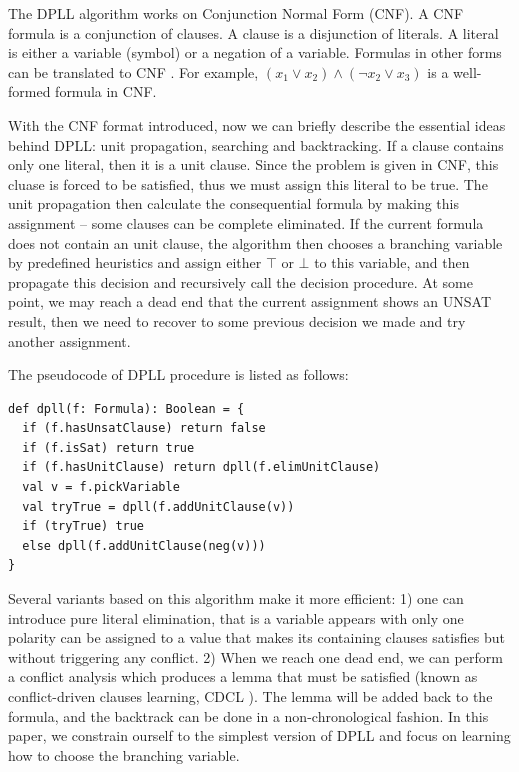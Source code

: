 \documentclass[sigplan,10pt]{acmart}\settopmatter{printfolios=true,printccs=false,printacmref=false}
\begin{document}
The DPLL algorithm works on Conjunction Normal Form (CNF). 
A CNF formula is a conjunction of clauses. A clause is a disjunction of literals. 
A literal is either a variable (symbol) or a negation of a variable. 
Formulas in other forms can be translated to CNF \cite{tseitin1983complexity}. 
For example, $(x_1 \vee x_2) \wedge (\neg x_2 \vee x_3)$ is a well-formed formula in CNF.

With the CNF format introduced, now we can briefly describe the essential ideas behind DPLL: 
unit propagation, searching and backtracking.
If a clause contains only one literal, then it is a unit clause. Since the problem is given 
in CNF, this cluase is forced to be satisfied, thus we must assign this literal to be true. 
The unit propagation then calculate the consequential formula by making this assignment --
some clauses can be complete eliminated.
If the current formula does not contain an unit clause, the algorithm then chooses a branching
variable by predefined heuristics and assign either $\top$ or $\bot$ to this variable,
and then propagate this decision and recursively call the decision procedure.
At some point, we may reach a dead end that the current assignment shows an UNSAT result, 
then we need to recover to some previous decision we made and try another assignment.

The pseudocode of DPLL procedure is listed as follows:

\begin{lstlisting}
def dpll(f: Formula): Boolean = {
  if (f.hasUnsatClause) return false
  if (f.isSat) return true
  if (f.hasUnitClause) return dpll(f.elimUnitClause)
  val v = f.pickVariable
  val tryTrue = dpll(f.addUnitClause(v))
  if (tryTrue) true
  else dpll(f.addUnitClause(neg(v)))
}
\end{lstlisting}

Several variants based on this algorithm make it more efficient: 1) one can introduce
pure literal elimination, that is a variable appears with only one polarity can be 
assigned to a value that makes its containing clauses satisfies but without triggering
any conflict. 2) When we reach one dead end, we can perform a conflict analysis which 
produces a lemma that must be satisfied (known as conflict-driven clauses learning, CDCL
\cite{DBLP:series/faia/SilvaLM09}). 
The lemma will be added back to the formula, and the backtrack can be done in a non-chronological fashion.
In this paper, we constrain ourself to the simplest version of DPLL and focus on
learning how to choose the branching variable.
\end{document}
